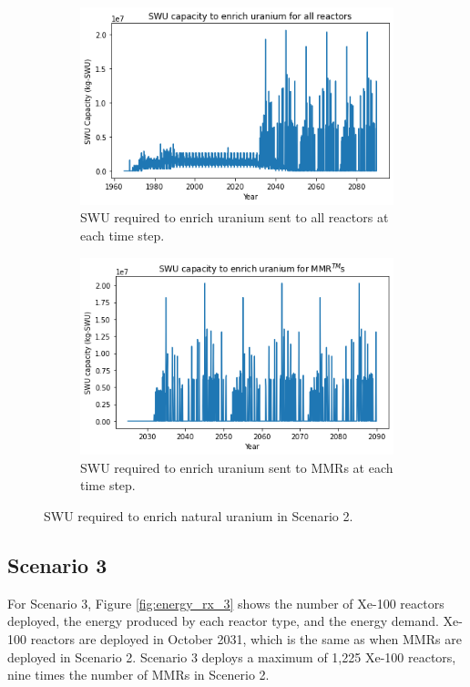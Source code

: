 \begin{figure}
    \centering
    \begin{subfigure}{0.45\textwidth}
        \centering
        \includegraphics[scale=0.4]{../figures/totalswu_scenarios_2.png}
        \caption{\gls{SWU} required to enrich uranium sent to all reactors at each time step.}
        \label{fig:totalswu_2}
    \end{subfigure}
    \hspace{0.8cm}
    \begin{subfigure}{0.45\textwidth}
        \centering
        \includegraphics[scale=0.4]{../figures/haleuSWU_scenarios_2.png}
        \caption{\gls{SWU} required to enrich uranium sent to \glspl{MMR} at each time step.}
        \label{fig:haleuswu_2}
    \end{subfigure}
    \caption{\gls{SWU} required to enrich natural uranium in Scenario 2.}
    \label{fig:swu_2}
\end{figure}

\subsection{Scenario 3}
For Scenario 3, Figure \ref{fig:energy_rx_3} shows the number of Xe-100 
reactors deployed, the energy produced by each reactor type, and the 
energy demand. Xe-100 reactors are deployed in October 2031, which is the 
same as when \glspl{MMR}
are deployed in Scenario 2. Scenario 3 deploys a maximum of 1,225 Xe-100 
reactors, nine times the number of \glspl{MMR} in Scenerio 2.

